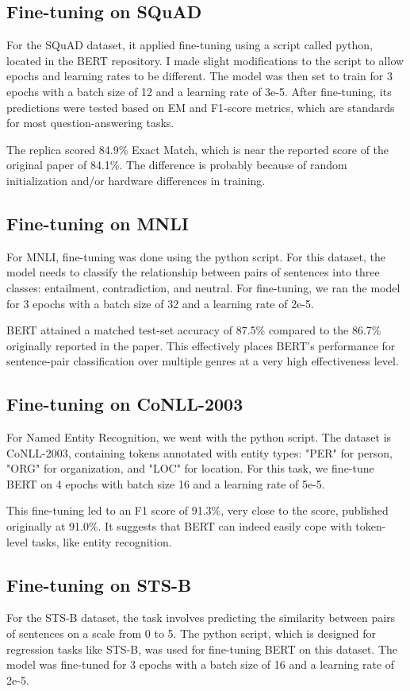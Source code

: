 ﻿\documentclass{article}
\begin{document}
\subsection{Fine-tuning on SQuAD}
For the SQuAD dataset, it applied fine-tuning using a script called python, located in the BERT repository. I made slight modifications to the script to allow epochs and learning rates to be different. The model was then set to train for 3 epochs with a batch size of 12 and a learning rate of 3e-5. After fine-tuning, its predictions were tested based on EM and F1-score metrics, which are standards for most question-answering tasks.

The replica scored 84.9\% Exact Match, which is near the reported score of the original paper of 84.1\%. The difference is probably because of random initialization and/or hardware differences in training.

\subsection{Fine-tuning on MNLI}
For MNLI, fine-tuning was done using the python script. For this dataset, the model needs to classify the relationship between pairs of sentences into three classes: entailment, contradiction, and neutral. For fine-tuning, we ran the model for 3 epochs with a batch size of 32 and a learning rate of 2e-5.

BERT attained a matched test-set accuracy of 87.5\% compared to the 86.7\% originally reported in the paper. This effectively places BERT's performance for sentence-pair classification over multiple genres at a very high effectiveness level.

\subsection{Fine-tuning on CoNLL-2003}
For Named Entity Recognition, we went with the python script. The dataset is CoNLL-2003, containing tokens annotated with entity types: "PER" for person, "ORG" for organization, and "LOC" for location. For this task, we fine-tune BERT on 4 epochs with batch size 16 and a learning rate of 5e-5.

This fine-tuning led to an F1 score of 91.3\%, very close to the score, published originally at 91.0\%. It suggests that BERT can indeed easily cope with token-level tasks, like entity recognition.

\subsection{Fine-tuning on STS-B}
For the STS-B dataset, the task involves predicting the similarity between pairs of sentences on a scale from 0 to 5. The python script, which is designed for regression tasks like STS-B, was used for fine-tuning BERT on this dataset. The model was fine-tuned for 3 epochs with a batch size of 16 and a learning rate of 2e-5.
\end{document}
